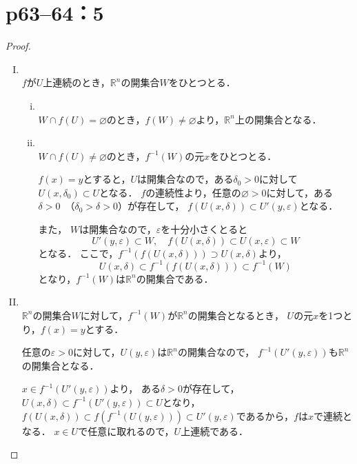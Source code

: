 \documentclass[a4paper,10pt,fleqn]{ltjsarticle}
\begin{document}
\section*{p63--64：5}
\begin{leftbar}
    \begin{proof} \mbox{　}
        \begin{enumerate}[(I)]
            \item \mbox{} \\
                  $f$が$U$上連続のとき，$\mathbb{R}^n$の開集合$W$をひとつとる．
                  \begin{enumerate}[(i)]
                      \item \mbox{} \\
                            $ W \cap f(U) = \varnothing$のとき，$f(W) \ne \varnothing$より，$\mathbb{R}^n$上の開集合となる．
                      \item \mbox{} \\
                            $ W \cap f(U) \ne \varnothing$のとき，$f^{-1} (W)$の元$x$をひとつとる．

                            $ f(x)=y$とすると，$U$は開集合なので，ある$\delta_0 >0$に対して$U(x,\delta_0) \subset U$となる．
                            $f$の連続性より，任意の$\varnothing >0$に対して，ある$\delta >0$~（$\delta_0 >\delta >0$）が存在して，
                            $f(U(x,\delta)) \subset U' (y,\varepsilon)$となる．

                            また， $W$は開集合なので，$\varepsilon$を十分小さくとると
                            \[
                                U'(y,\varepsilon) \subset W,\quad f(U(x,\delta)) \subset U (x,\varepsilon) \subset W
                            \]
                            となる．
                            ここで，$f^{-1} (f(U(x,\delta))) \supset U(x,\delta)$より，
                            \[
                                U(x,\delta) \subset f^{-1} (f(U(x,\delta))) \subset f^{-1} (W)
                            \]
                            となり，$f^{-1} (W)$は$\mathbb{R}^n$の開集合である．
                  \end{enumerate}
            \item \mbox{} \\
                  $ \mathbb{R}^n$の開集合$W$に対して，$f^{-1} (W)$が$\mathbb{R}^n$の開集合となるとき，
                  $U$の元$x$を1つとり，$f(x)=y$とする．

                  任意の$\varepsilon >0$に対して，$U(y,\varepsilon)$は$\mathbb{R}^n$の開集合なので，
                  $f^{-1} (U'(y,\varepsilon))$も$\mathbb{R}^n$の開集合となる．

                  $x \in f^{-1} (U'(y,\varepsilon))$より，
                  ある$\delta >0$が存在して，$U(x,\delta) \subset  f^{-1}(U'(y,\varepsilon)) \subset U$となり，
                  $f(U(x,\delta)) \subset f(f^{-1}(U(y,\varepsilon))) \subset U'(y,\varepsilon)$であるから，$f$は$x$で連続となる．
                  $x \in U$で任意に取れるので，$U$上連続である．
        \end{enumerate}
    \end{proof}
\end{leftbar}
\end{document}
